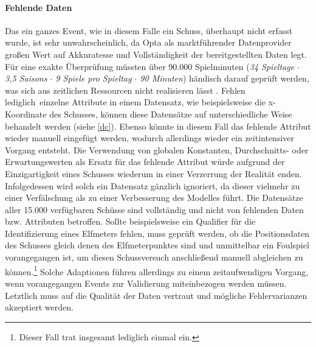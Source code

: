\paragraph{Fehlende Daten}
Das ein ganzes Event, wie in diesem Falle ein Schuss, überhaupt nicht erfasst wurde, ist sehr unwahrscheinlich, da Opta als marktführender Datenprovider großen Wert auf Akkuratesse und Vollständigkeit der bereitgestellten Daten legt. Für eine exakte Überprüfung müssten über 90.000 Spielminuten (\textit{34 Spieltage $\cdot$ 3,5 Saisons $\cdot$ 9 Spiele pro Spieltag $\cdot$ 90 Minuten}) händisch darauf geprüft werden, was sich aus zeitlichen Ressourcen nicht realisieren lässt	. Fehlen \glqq lediglich\grqq~einzelne Attribute in einem Datensatz, wie beispielsweise die x-Koordinate des Schusses, können diese Datensätze auf unterschiedliche Weise behandelt werden (siehe \vref{dc}). Ebenso könnte in diesem Fall das fehlende Attribut wieder manuell eingefügt werden, wodurch allerdings wieder ein zeitintensiver Vorgang entsteht. Die Verwendung von globalen Konstanten, Durchschnitts- oder Erwartungswerten als Ersatz für das fehlende Attribut würde aufgrund der Einzigartigkeit eines Schusses wiederum in einer Verzerrung der Realität enden. Infolgedessen wird solch ein Datensatz gänzlich ignoriert, da dieser vielmehr zu einer Verfälschung als zu einer Verbesserung des Modelles führt. Die Datensätze aller 15.000 verfügbaren Schüsse sind vollständig und nicht von fehlenden Daten bzw. Attributen betroffen. Sollte beispielsweise ein Qualifier für die Identifizierung eines Elfmeters fehlen, muss geprüft werden, ob die Positionsdaten des Schusses gleich denen des Elfmeterpunktes sind und unmittelbar ein Foulspiel vorangegangen ist, um diesen Schussversuch anschließend manuell abgleichen zu können.\footnote{Dieser Fall trat insgesamt lediglich einmal ein.} Solche Adaptionen führen allerdings zu einem zeitaufwendigen Vorgang, wenn vorangegangen Events zur Validierung miteinbezogen werden müssen. Letztlich muss auf die Qualität der Daten vertraut und mögliche Fehlervarianzen akzeptiert werden.

